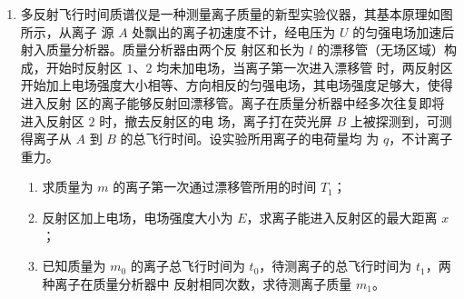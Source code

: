 \begin{enumerate}





\newpage
\item
多反射飞行时间质谱仪是一种测量离子质量的新型实验仪器，其基本原理如图所示，从离子
源 $ A $ 处飘出的离子初速度不计，经电压为 $ U $ 的匀强电场加速后射入质量分析器。质量分析器由两个反
射区和长为 $ l $ 的漂移管（无场区域）构成，开始时反射区 $ 1 $、$ 2 $ 均未加电场，当离子第一次进入漂移管
时，两反射区开始加上电场强度大小相等、方向相反的匀强电场，其电场强度足够大，使得进入反射
区的离子能够反射回漂移管。离子在质量分析器中经多次往复即将进入反射区 $ 2 $ 时，撤去反射区的电
场，离子打在荧光屏 $ B $ 上被探测到，可测得离子从 $ A $ 到 $ B $ 的总飞行时间。设实验所用离子的电荷量均
为 $ q $，不计离子重力。
\begin{enumerate}
\item
求质量为 $ m $ 的离子第一次通过漂移管所用的时间 $ T_{1} $；
\item 
反射区加上电场，电场强度大小为 $ E $，求离子能进入反射区的最大距离 $ x $；
\item 
已知质量为 $ m_{0} $ 的离子总飞行时间为 $ t_{0} $，待测离子的总飞行时间为 $ t_{1} $，两种离子在质量分析器中
反射相同次数，求待测离子质量 $ m_{1} $。



\end{enumerate}
\begin{figure}[h!]
\flushright

\end{figure}





\end{enumerate}

